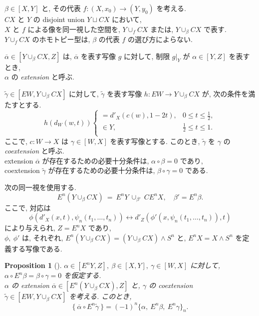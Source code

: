 \documentclass[12pt, leqno]{ltjsarticle}
\newcommand{\Ex}{E}        %
\numberwithin{equation}{section}
\theoremstyle{plain}
\newtheorem{proposition}[theorem]{Proposition}
\theoremstyle{definition}
\theoremstyle{remark}
\begin{document}
$\beta\in[X, Y]$ と, その代表 $f:(X,x_0)\to(Y,y_0)$ を考える.\\
\(CX\) と \(Y\) の disjoint union \(Y \sqcup CX\)
において, \\
\(X\) と \(f\) による像を同一視した空間を,
\(Y\cup_f CX\) または, \(Y\cup_\beta CX\) で表す.\\
$Y\cup_f CX$ のホモトピー型は, \(\beta\) の代表 $f$ の選び方によらない. 

\(\overline{\alpha}\in[Y\cup_\beta CX, Z]\)
は, \(\overline{\alpha}\) を表す写像 \(g\)
に対して, 
制限 \(g|_{Y}\) が \(\alpha\in[Y,Z]\) を表すとき,\\
$\alpha$ の \emph{extension} と呼ぶ.

\(\widetilde{\gamma}\in[EW,Y\cup_\beta CX]\)
に対して, \(\widetilde{\gamma}\) を表す写像 
\(h:EW\to Y\cup_\beta CX\)
が, 次の条件を満たすとする.
\[
h(d_W(w, t)) \left\{
\begin{array}{ll}
= d'_X(c(w), 1-2t), & 0 \leq t \leq \frac{1}{2}, \\
\in Y, & \frac{1}{2} \leq t \leq 1. \\
\end{array}\right.
\]
ここで, \(c:W\to X\) は \(\gamma\in[W,X]\) を表す写像とする.
このとき, \(\widetilde{\gamma}\) を \(\gamma\) の \emph{coextension} と呼ぶ.\\
extension $\overline\alpha$ が存在するための必要十分条件は,
$\alpha\circ \beta=0$ であり,\\
coextension $\widetilde{\gamma}$ が存在するための必要十分条件は,
$\beta\circ\gamma=0$ である. 

次の同一視を使用する.
\begin{equation}\label{eq:cone-susp}
\Ex^n(Y\cup_\beta CX)\ =\ 
\Ex^nY\ \cup_{\beta'}\ C\Ex^n X,\quad \beta'=\Ex^n \beta.
\end{equation}
ここで, 対応は
\[
\phi(d'_X(x,t),\psi_n(t_1,\ldots,t_n))\longleftrightarrow d'_Z(\phi'(x,\psi_n(t_1,\ldots,t_n)),t)
\]
により与えられ, $Z=\Ex^n X$ であり, \\
$\phi, \ \phi'$ は, それぞれ, 
$\Ex^n(Y\cup_\beta CX)=(Y\cup_\beta CX)\wedge S^n$ と,
$\Ex^n X=X\wedge S^n$ を定義する写像である. 

\begin{proposition}[]\label{prop:1-7}
\(\alpha\in[E^nY, Z],\ \beta\in[X,Y],\ \gamma\in[W,X]\) に対して,
  $\alpha\circ \Ex^n\beta=\beta\circ\gamma=0$ を仮定する. \\
$\alpha$ の extension $\overline\alpha\in[\Ex^n(Y\cup_\beta CX), Z]$ と,
$\gamma$ の coextension $\widetilde\gamma\in[EW, Y\cup_\beta CX]$ を考える. 
このとき,
\[
\{\ \overline\alpha\circ \Ex^n\widetilde\gamma\ \}
= (-1)^n\{\alpha,\ \Ex^n\beta,\ \Ex^n\gamma\}_n.
\]
\end{proposition}
\end{document}
